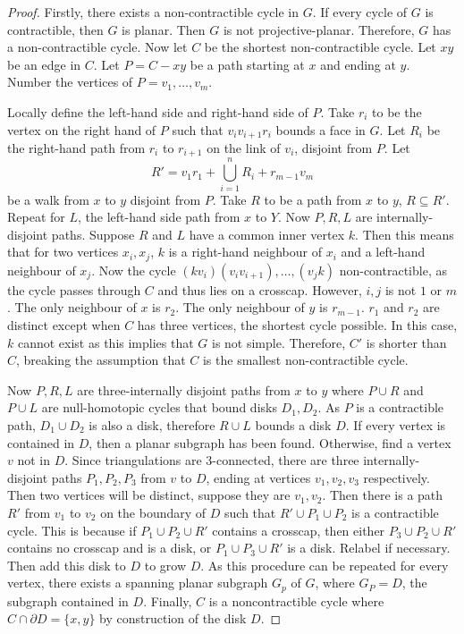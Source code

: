 \begin{proof}
     Firstly, there exists a non-contractible cycle in $G$. If every cycle of $G$ is contractible, then $G$ is planar. Then $G$ is not projective-planar. Therefore, $G$ has a non-contractible cycle. Now let $C$ be the shortest non-contractible cycle. Let $xy$ be an edge in $C$. Let $P = C - xy$ be a path starting at $x$ and ending at $y$. 
    Number the vertices of $P = v_1, \ldots, v_m$. 

    Locally define the left-hand side and right-hand side of $P$. Take $r_i$ to be the vertex on the right hand of $P$ such that $v_i v_{i + 1} r_i$ bounds a face in $G$. Let $R_i$ be the right-hand path from $r_i$ to $r_{i + 1}$ on the link of $v_i$, disjoint from $P$. Let 
    \begin{equation*}
        R' = v_1 r_1 + \bigcup_{i = 1}^n R_i + r_{m-1} v_m
    \end{equation*}
    be a walk from $x$ to $y$ disjoint from $P$. Take $R$ to be a path from $x$ to $y$, $R \subseteq R'$. Repeat for $L$, the left-hand side path from $x$ to $Y$. Now $P, R, L$ are internally-disjoint paths. Suppose $R$ and $L$ have a common inner vertex $k$. Then this means that for two vertices $x_i, x_j$, $k$ is a right-hand neighbour of $x_i$ and a left-hand neighbour of $x_j$. Now the cycle $(k v_i) (v_i v_{i + 1}), \ldots , (v_j k)$ non-contractible, as the cycle passes through $C$ and thus lies on a crosscap. However, $i, j$ is not $1$ or $m$. The only neighbour of $x$ is $r_2$. The only neighbour of $y$ is $r_{m-1}$. $r_1$ and $r_2$ are distinct except when $C$ has three vertices, the shortest cycle possible. In this case, $k$ cannot exist as this implies that $G$ is not simple. Therefore, $C'$ is shorter than $C$, breaking the assumption that $C$ is the smallest non-contractible cycle.

    Now $P, R, L$ are three-internally disjoint paths from $x$ to $y$ where $P \cup R$ and $P \cup L$ are null-homotopic cycles that bound disks $D_1, D_2$. As $P$ is a contractible path, $D_1 \cup D_2$ is also a disk, therefore $R \cup L$ bounds a disk $D$. If every vertex is contained in $D$, then a planar subgraph has been found. Otherwise, find a vertex $v$ not in $D$. Since triangulations are 3-connected, there are three internally-disjoint paths $P_1, P_2, P_3$ from $v$ to $D$, ending at vertices $v_1, v_2, v_3$ respectively. Then two vertices will be distinct, suppose they are $v_1, v_2$. Then there is a path $R'$ from $v_1$ to $v_2$ on the boundary of $D$ such that $R' \cup P_1 \cup P_2$ is a contractible cycle. This is because if $P_1 \cup P_2 \cup R'$ contains a crosscap, then either $P_3 \cup P_2 \cup R'$ contains no crosscap and is a disk, or $P_1 \cup P_3 \cup R'$ is a disk. Relabel if necessary. Then add this disk to $D$ to grow $D$. As this procedure can be repeated for every vertex, there exists a spanning planar subgraph $G_p$ of $G$, where $G_P = D$, the subgraph contained in $D$. Finally, $C$ is a noncontractible cycle where $C \cap \partial D = \{x, y\}$ by construction of the disk $D$. 
\end{proof}
